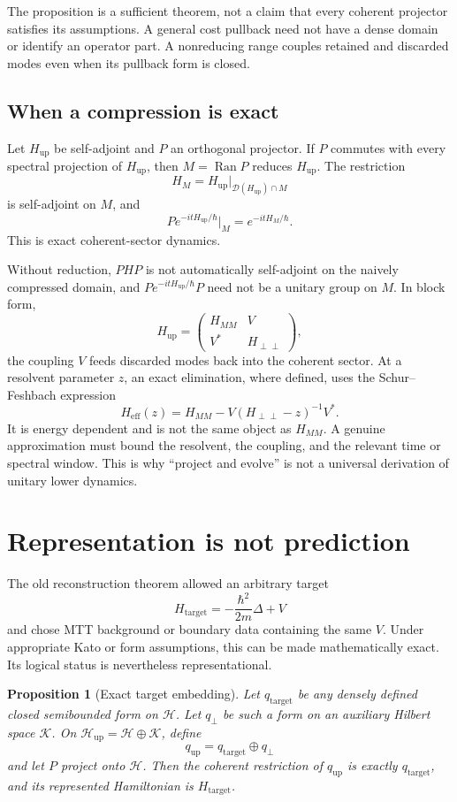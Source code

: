 \documentclass[11pt]{article}
\newtheorem{proposition}[theorem]{Proposition}
\theoremstyle{definition}
\theoremstyle{remark}
\newcommand{\cD}{\mathcal D}
\newcommand{\cH}{\mathcal H}
\newcommand{\cK}{\mathcal K}
\newcommand{\Ran}{\operatorname{Ran}}
\begin{document}
The proposition is a sufficient theorem, not a claim that every coherent
projector satisfies its assumptions. A general cost pullback need not have
a dense domain or identify an operator part. A nonreducing range couples
retained and discarded modes even when its pullback form is closed.

\subsection{When a compression is exact}

Let \(H_{\mathrm{up}}\) be self-adjoint and \(P\) an orthogonal projector.
If \(P\) commutes with every spectral projection of
\(H_{\mathrm{up}}\), then \(M=\Ran P\) reduces \(H_{\mathrm{up}}\).  The
restriction
\[
H_M=H_{\mathrm{up}}\big|_{\cD(H_{\mathrm{up}})\cap M}
\]
is self-adjoint on \(M\), and
\[
Pe^{-itH_{\mathrm{up}}/\hbar}\big|_M
=e^{-itH_M/\hbar}.
\]
This is exact coherent-sector dynamics.

Without reduction, \(PHP\) is not automatically self-adjoint on the naively
compressed domain, and \(Pe^{-itH_{\mathrm{up}}/\hbar}P\) need not be a
unitary group on \(M\).  In block form,
\[
H_{\mathrm{up}}
=
\begin{pmatrix}
H_{MM} & V\\
V^* & H_{\perp\perp}
\end{pmatrix},
\]
the coupling \(V\) feeds discarded modes back into the coherent sector.  At
a resolvent parameter \(z\), an exact elimination, where defined, uses the
Schur--Feshbach expression
\[
H_{\mathrm{eff}}(z)
=H_{MM}
-V(H_{\perp\perp}-z)^{-1}V^*.
\]
It is energy dependent and is not the same object as \(H_{MM}\).  A genuine
approximation must bound the resolvent, the coupling, and the relevant time
or spectral window.  This is why ``project and evolve'' is not a universal
derivation of unitary lower dynamics.

\section{Representation is not prediction}
\label{sec:representation}

The old reconstruction theorem allowed an arbitrary target
\[
H_{\mathrm{target}}
=-\frac{\hbar^2}{2m}\Delta+V
\]
and chose MTT background or boundary data containing the same \(V\).  Under
appropriate Kato or form assumptions, this can be made mathematically exact.
Its logical status is nevertheless representational.

\begin{proposition}[Exact target embedding]
\label{prop:embedding}
Let \(q_{\mathrm{target}}\) be any densely defined closed semibounded form on
\(\cH\).  Let \(q_\perp\) be such a form on an auxiliary Hilbert space
\(\cK\).  On \(\cH_{\mathrm{up}}=\cH\oplus\cK\), define
\[
q_{\mathrm{up}}=q_{\mathrm{target}}\oplus q_\perp
\]
and let \(P\) project onto \(\cH\).  Then the coherent restriction of
\(q_{\mathrm{up}}\) is exactly \(q_{\mathrm{target}}\), and its represented
Hamiltonian is \(H_{\mathrm{target}}\).
\end{proposition}
\end{document}
